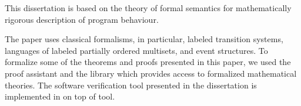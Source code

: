 {\methods} This dissertation is based on the theory of formal semantics for mathematically rigorous 
description of program behaviour.

The paper uses classical formalisms, in particular, labeled transition systems, languages of labeled partially ordered multisets, and event structures. To formalize some of the theorems and proofs presented in this paper, we used the \coq proof assistant and the \mathcomp library which provides access to formalized mathematical theories. 
The software verification tool presented in the dissertation is implemented in \CLANG on top of \genmc tool.


